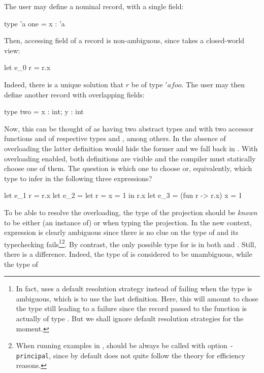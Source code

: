 \documentclass[acmsmall,screen,nonacm]{acmart}
\begin{document}
The user may define a nominal record, with \eg a single field:
\begin{program}[input]
type 'a one = {x : 'a}
\end{program}
Then, accessing field  of a record is non-ambiguous, since
\OCaml takes a closed-world view:
\begin{program}[input]
let e_0 r = r.x
\end{program}
Indeed, there is a unique solution that \ocaml$r$ be of type \ocaml$'a foo$.
The user may then define another record with overlapping fields:
\begin{program}[input]
type two = {x : int; y : int}
\end{program}
Now, this can be thought of as having two abstract types  and
 with two accessor functions  and
 of respective types  and
, among others.
%
In the absence of overloading the latter definition would hide the former
and we fall back in \ML.  With overloading enabled, both definitions are
visible and the compiler must statically choose one of them.
%
The question is which one to choose or, equivalently, which type to infer
in the following three expressions?
\begin{program}[input]
let e_1 r = r.x
let e_2 = let r = {x = 1} in r.x
let e_3 = (fun r -> r.x) {x = 1}
\end{program}
To be able to resolve the overloading, the type of the projection should be
\emph{known} to be either (an instance of)  or 
when typing the projection.  In the new context, expression
 is clearly ambiguous since there is no clue on the type
of  and its typechecking fails\footnote {In fact, \OCaml uses a
default resolution strategy instead of failing when the type is ambiguous,
which is to use the last definition. Here, this will amount to chose the
type  still leading to a failure since the record passed to the
function is actually of type . But we shall ignore default
resolution strategies for the moment.}\footnote {When running examples in
\OCaml,
\OCaml should be always be called with option \texttt{-principal}, since by
default \OCaml does not quite follow the theory for efficiency reasons.}.
%
By contrast, the only possible type for  is  in both
 and .  Still, there is a difference.  Indeed, the
type of  is considered to be unambiguous, while the type of
\end{document}
